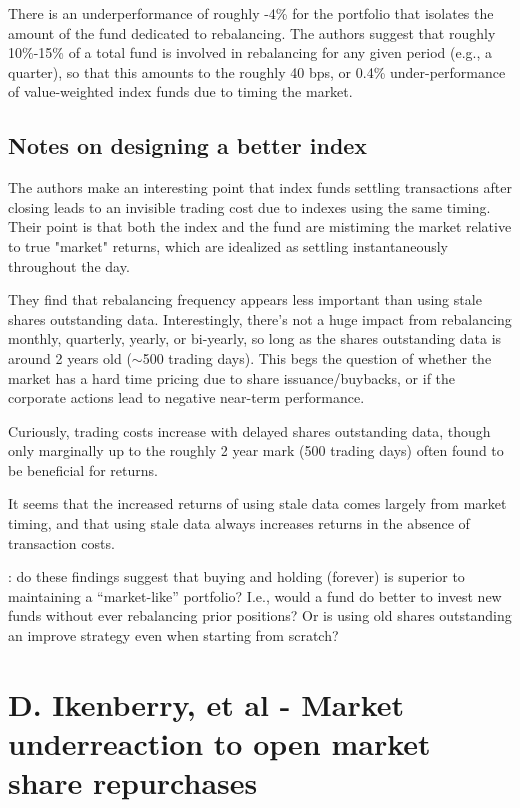 \documentclass{article}
\begin{document}
There is an underperformance of roughly -4\% for the portfolio that isolates the amount of the fund dedicated to rebalancing.  The authors suggest that roughly 10\%-15\% of a total fund is involved in rebalancing for any given period (e.g., a quarter), so that this amounts to the roughly 40 bps, or 0.4\% under-performance of value-weighted index funds due to timing the market.

\subsection{Notes on designing a better index}

The authors make an interesting point that index funds settling transactions after closing leads to an invisible trading cost due to indexes using the same timing.  Their point is that both the index and the fund are mistiming the market relative to true "market" returns, which are idealized as settling instantaneously throughout the day.

They find that rebalancing frequency appears less important than using stale shares outstanding data.  Interestingly, there's not a huge impact from rebalancing monthly, quarterly, yearly, or bi-yearly, so long as the shares outstanding data is around 2 years old ($\sim$500 trading days).  This begs the question of whether the market has a hard time pricing due to share issuance/buybacks, or if the corporate actions lead to negative near-term performance.

Curiously, trading costs increase with delayed shares outstanding data, though only marginally up to the roughly 2 year mark (500 trading days) often found to be beneficial for returns.

It seems that the increased returns of using stale data comes largely from market timing, and that using stale data always increases returns in the absence of transaction costs.

\note{[Note]}: do these findings suggest that buying and holding (forever) is superior to maintaining a ``market-like'' portfolio?  I.e., would a fund do better to invest new funds without ever rebalancing prior positions?  Or is using old shares outstanding an improve strategy even when starting from scratch?


\section{D. Ikenberry, et al - Market underreaction to open market share repurchases}
\end{document}

